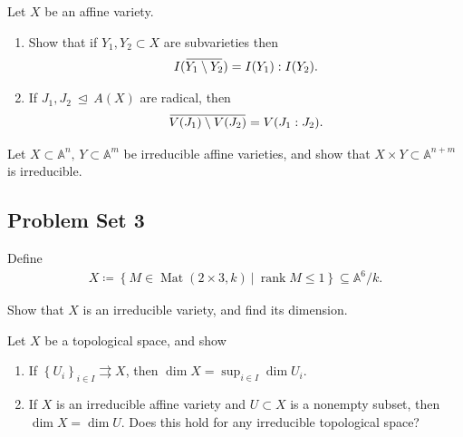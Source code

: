 \begin{exercise}[Gathmann 2.23]

Let \(X\) be an affine variety.

\begin{enumerate}
\def\labelenumi{\alph{enumi}.}
\item
  Show that if \(Y_1, Y_2 \subset X\) are subvarieties then
  \begin{align*}  
  I(\mkern 1.5mu\overline{\mkern-1.5muY_1\setminus Y_2\mkern-1.5mu}\mkern 1.5mu) = I(Y_1): I(Y_2)
  .\end{align*}
\item
  If \(J_1, J_2 {~\trianglelefteq~}A(X)\) are radical, then
  \begin{align*}  
  \mkern 1.5mu\overline{\mkern-1.5muV(J_1) \setminus V(J_2)\mkern-1.5mu}\mkern 1.5mu = V(J_1: J_2)
  .\end{align*}
\end{enumerate}

\end{exercise}

\begin{exercise}[Gathmann 2.24]

Let \(X \subset {\mathbb{A}}^n,\, Y\subset {\mathbb{A}}^m\) be
irreducible affine varieties, and show that
\(X\times Y\subset {\mathbb{A}}^{n+m}\) is irreducible.

\end{exercise}

\hypertarget{problem-set-3}{%
\subsection{Problem Set 3}\label{problem-set-3}}

\begin{exercise}[Gathmann 2.33]

Define
\begin{align*}  
X \coloneqq\left\{{M \in \operatorname{Mat}(2\times 3, k) {~\mathrel{\Big|}~}{\operatorname{rank}}M \leq 1}\right\} \subseteq {\mathbb{A}}^6/k
.\end{align*}

Show that \(X\) is an irreducible variety, and find its dimension.

\end{exercise}

\begin{exercise}[Gathmann 2.34]

Let \(X\) be a topological space, and show

\begin{enumerate}
\def\labelenumi{\alph{enumi}.}
\item
  If \(\left\{{U_i}\right\}_{i\in I} \rightrightarrows X\), then
  \(\dim X = \sup_{i\in I} \dim U_i\).
\item
  If \(X\) is an irreducible affine variety and \(U\subset X\) is a
  nonempty subset, then \(\dim X = \dim U\). Does this hold for any
  irreducible topological space?
\end{enumerate}

\end{exercise}

